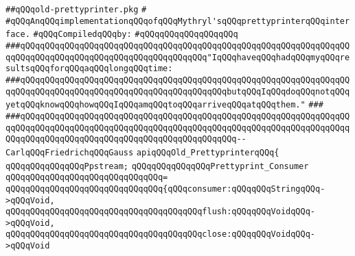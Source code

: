 \label{src/lib/prettyprint/big/src/old-prettyprinter.pkg}
\verb|##qQQqold-prettyprinter.pkg|\newline
\verb|#|\newline
\verb|#qQQqAnqQQqimplementationqQQqofqQQqMythryl'sqQQqprettyprinterqQQqinterface.|\newline
\newline
\verb|#qQQqCompiledqQQqby:|\newline
\verb|#qQQqqQQqqQQqqQQqqQQq|\newline
\newline
\newline
\newline
\newline
\verb|###qQQqqQQqqQQqqQQqqQQqqQQqqQQqqQQqqQQqqQQqqQQqqQQqqQQqqQQqqQQqqQQqqQQqqQQqqQQqqQQqqQQqqQQqqQQqqQQqqQQqqQQqqQQq"IqQQqhaveqQQqhadqQQqmyqQQqresultsqQQqforqQQqaqQQqlongqQQqtime:|\newline
\verb|###qQQqqQQqqQQqqQQqqQQqqQQqqQQqqQQqqQQqqQQqqQQqqQQqqQQqqQQqqQQqqQQqqQQqqQQqqQQqqQQqqQQqqQQqqQQqqQQqqQQqqQQqqQQqqQQqbutqQQqIqQQqdoqQQqnotqQQqyetqQQqknowqQQqhowqQQqIqQQqamqQQqtoqQQqarriveqQQqatqQQqthem."|\newline
\verb|###|\newline
\verb|###qQQqqQQqqQQqqQQqqQQqqQQqqQQqqQQqqQQqqQQqqQQqqQQqqQQqqQQqqQQqqQQqqQQqqQQqqQQqqQQqqQQqqQQqqQQqqQQqqQQqqQQqqQQqqQQqqQQqqQQqqQQqqQQqqQQqqQQqqQQqqQQqqQQqqQQqqQQqqQQqqQQqqQQqqQQqqQQqqQQqqQQq--CarlqQQqFriedrichqQQqGauss|\newline
\newline
\newline
\newline
\verb|apiqQQqOld_PrettyprinterqQQq{|\newline
\newline
\verb|qQQqqQQqqQQqqQQqPpstream;|\newline
\newline
\verb|qQQqqQQqqQQqqQQqPrettyprint_Consumer|\newline
\verb|qQQqqQQqqQQqqQQqqQQqqQQqqQQqqQQq=|\newline
\verb|qQQqqQQqqQQqqQQqqQQqqQQqqQQqqQQq{qQQqconsumer:qQQqqQQqStringqQQq->qQQqVoid,|\newline
\verb|qQQqqQQqqQQqqQQqqQQqqQQqqQQqqQQqqQQqqQQqflush:qQQqqQQqVoidqQQq->qQQqVoid,|\newline
\verb|qQQqqQQqqQQqqQQqqQQqqQQqqQQqqQQqqQQqqQQqclose:qQQqqQQqVoidqQQq->qQQqVoid|\newline

